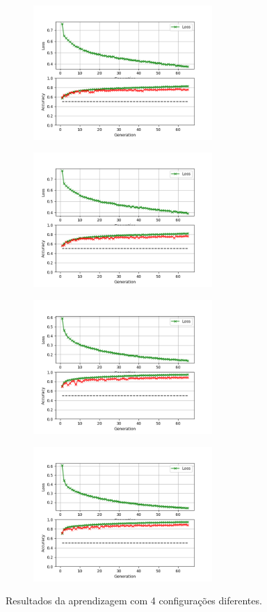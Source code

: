 \begin{figure} [h]
  \centering
  \begin{subfigure}{6.8cm}
    \centering\includegraphics[width=6.8cm]{bom_bom.png}
    \caption{}
  \end{subfigure}
  \begin{subfigure}{6.8cm}
    \centering\includegraphics[width=6.8cm]{bom_mau.png}
    \caption{}
  \end{subfigure}
  \begin{subfigure}{6.8cm}
    \centering\includegraphics[width=6.8cm]{mau_bom.png}
    \caption{}
  \end{subfigure}
  \begin{subfigure}{6.8cm}
    \centering\includegraphics[width=6.8cm]{mau_mau.png}
    \caption{}
  \end{subfigure}
  \caption{Resultados da aprendizagem com 4 configurações diferentes.}
  \label{fig:graficos}
\end{figure}


